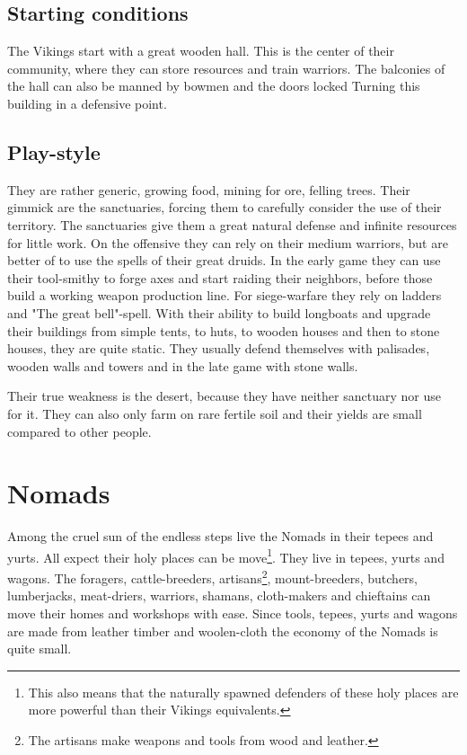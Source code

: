 \documentclass[a4paper]{article}
\begin{document}
	\subsection{Starting conditions}
		The \gls{Vikings} start with a great wooden hall.
		This is the center of their community, where they can store resources
		and train warriors.
		The balconies of the hall can also be manned by bowmen and the doors locked
		Turning this building in a defensive point.

	\subsection{Play-style}
		They are rather generic, growing food, mining for ore, felling trees.
		Their gimmick are the sanctuaries, forcing them to carefully consider the use of their territory.
		The sanctuaries give them a great natural defense and infinite resources for little work.
		On the offensive they can rely on their medium warriors,
		but are better of to use the spells of their great druids.
		In the early game they can use their tool-smithy to forge axes and start raiding their neighbors,
		before those build a working weapon production line.
		For siege-warfare they rely on ladders and "The great bell"-spell.
		With their ability to build longboats and upgrade their buildings from simple tents,
		to huts, to wooden houses  and then to stone houses, they are quite static.
		They usually defend themselves with palisades, wooden walls and towers and in the
		late game with stone walls.

		Their true weakness is the desert, because they have neither sanctuary nor use for it.
		They can also only farm on rare fertile soil and their yields are small compared to
		other people.

\section{\Gls{Nomads}}

	Among the cruel sun of the endless steps live the \gls{Nomads} in their tepees and yurts.
	All expect their holy places can be move\footnote{
		This also means that the naturally spawned defenders of these holy
		places are more powerful than their \gls{Vikings} equivalents.
	}.
	They live in tepees, yurts and wagons.
	The foragers, cattle-breeders, artisans\footnote{
		The artisans make weapons and tools from wood and leather.
	}, 
	mount-breeders, butchers, lumberjacks, meat-driers, warriors, shamans, cloth-makers 
	and chieftains can move their homes and workshops with ease.
	Since tools, tepees, yurts and wagons are made from leather timber and woolen-cloth
	the economy of the \gls{Nomads} is quite small.
\end{document}

